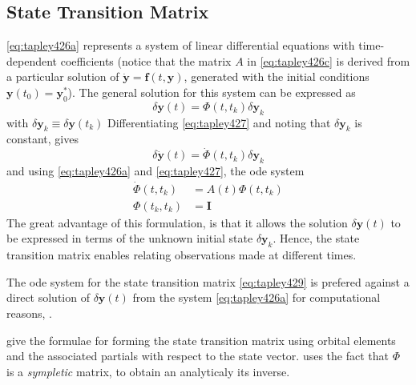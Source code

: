 \subsection{State Transition Matrix}\label{ssec:pod-state-transition-matrix}

\autoref{eq:tapley426a} represents a system of linear differential equations with 
time-dependent coefficients (notice that the matrix $A$ in \autoref{eq:tapley426c} 
is derived from a particular solution of $\dot{\bm{y}}=\bm{f}(t,\bm{y})$, generated 
with the initial conditions $\bm{y}(t_0)=\bm{y}^{*}_{0}$). The general solution for 
this system can be expressed as 
\begin{equation}\label{eq:tapley427}
    \delta \bm{y}(t) = \Phi (t,t_k) \delta \bm{y}_k
\end{equation}
with $\delta \bm{y}_k \equiv \delta \bm{y}(t_k)$
Differentiating \autoref{eq:tapley427} and noting that $\delta \bm{y}_k$ is constant, 
gives
\begin{equation}\label{eq:tapley429}
    \delta \dot{\bm{y}}(t) = \dot{\Phi} (t,t_k) \delta \bm{y}_k
\end{equation}
and using \autoref{eq:tapley426a} and \autoref{eq:tapley427}, the \gls{ode} system 
\begin{equation}\label{eq:tapley4210}
    \begin{aligned}
        \dot{\Phi} (t,t_k) &= A(t) \Phi (t,t_k) \\
        \Phi (t_k,t_k) &= \bm{I}
    \end{aligned}
\end{equation}
The great advantage of this formulation, is that it allows the solution $\delta \bm{y}(t)$ 
to be expressed in terms of the unknown initial state $\delta \bm{y}_k$. Hence, the 
state transition matrix enables relating observations made at different times.
    
The \gls{ode} system for the state transition matrix \autoref{eq:tapley429} 
is prefered against a direct solution of $\delta \bm{y}(t)$ from the system
\autoref{eq:tapley426a} for computational reasons, \cite{Tapley2004}.

\cite{Montenbruck2000} give the formulae for forming the state transition matrix 
using orbital elements and the associated partials with respect to the state vector.
\cite{Battin1999} uses the fact that $\Phi$ is a \emph{sympletic} matrix, to obtain 
an analyticaly its inverse.
